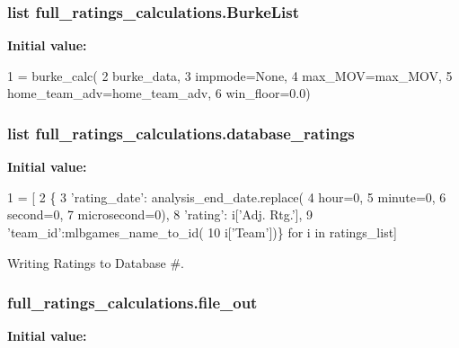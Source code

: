 \subsubsection[{\texorpdfstring{Burke\+List}{BurkeList}}]{\setlength{\rightskip}{0pt plus 5cm}list full\+\_\+ratings\+\_\+calculations.\+Burke\+List}\hypertarget{namespacefull__ratings__calculations_a55aa8d60dd5ce6735ffb47aa65a02b55}{}\label{namespacefull__ratings__calculations_a55aa8d60dd5ce6735ffb47aa65a02b55}
{\bfseries Initial value\+:}
\begin{DoxyCode}
1 = burke\_calc(
2     burke\_data,
3     impmode=\textcolor{keywordtype}{None},
4     max\_MOV=max\_MOV,
5     home\_team\_adv=home\_team\_adv,
6     win\_floor=0.0)
\end{DoxyCode}
\subsubsection[{\texorpdfstring{database\+\_\+ratings}{database_ratings}}]{\setlength{\rightskip}{0pt plus 5cm}list full\+\_\+ratings\+\_\+calculations.\+database\+\_\+ratings}\hypertarget{namespacefull__ratings__calculations_a3a94f1d9d2af1e1c5501e0179768384d}{}\label{namespacefull__ratings__calculations_a3a94f1d9d2af1e1c5501e0179768384d}
{\bfseries Initial value\+:}
\begin{DoxyCode}
1 = [
2     \{
3         \textcolor{stringliteral}{'rating\_date'}: analysis\_end\_date.replace(
4             hour=0,
5             minute=0,
6             second=0,
7             microsecond=0),
8         \textcolor{stringliteral}{'rating'}: i[\textcolor{stringliteral}{'Adj. Rtg.'}],
9         \textcolor{stringliteral}{'team\_id'}:mlbgames\_name\_to\_id(
10             i[\textcolor{stringliteral}{'Team'}])\} \textcolor{keywordflow}{for} i \textcolor{keywordflow}{in} ratings\_list]
\end{DoxyCode}


Writing Ratings to Database \#. 

\subsubsection[{\texorpdfstring{file\+\_\+out}{file_out}}]{\setlength{\rightskip}{0pt plus 5cm}full\+\_\+ratings\+\_\+calculations.\+file\+\_\+out}\hypertarget{namespacefull__ratings__calculations_ad222c702d72dea5e00727f1bcab409e5}{}\label{namespacefull__ratings__calculations_ad222c702d72dea5e00727f1bcab409e5}
{\bfseries Initial value\+:}


